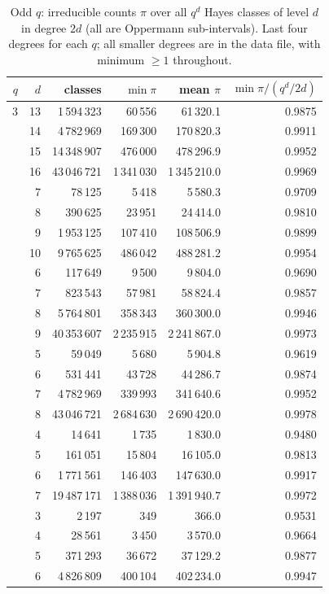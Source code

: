 \begin{table}[!htbp]
\centering
\caption{Odd $q$: irreducible counts $\pi$ over all $q^d$ Hayes classes of level $d$ in degree $2d$ (all are Oppermann sub-intervals). Last four degrees for each $q$; all smaller degrees are in the data file, with minimum $\ge1$ throughout.}\label{tab:odd}
\begin{tabular}{rrrrrr}
\toprule
$q$ & $d$ & classes & $\min\pi$ & mean $\pi$ & $\min\pi/(q^d/2d)$\\
\midrule
3 & 13 & 1\,594\,323 & 60\,556 & 61\,320.1 & 0.9875\\
 & 14 & 4\,782\,969 & 169\,300 & 170\,820.3 & 0.9911\\
 & 15 & 14\,348\,907 & 476\,000 & 478\,296.9 & 0.9952\\
 & 16 & 43\,046\,721 & 1\,341\,030 & 1\,345\,210.0 & 0.9969\\
\addlinespace
5 & 7 & 78\,125 & 5\,418 & 5\,580.3 & 0.9709\\
 & 8 & 390\,625 & 23\,951 & 24\,414.0 & 0.9810\\
 & 9 & 1\,953\,125 & 107\,410 & 108\,506.9 & 0.9899\\
 & 10 & 9\,765\,625 & 486\,042 & 488\,281.2 & 0.9954\\
\addlinespace
7 & 6 & 117\,649 & 9\,500 & 9\,804.0 & 0.9690\\
 & 7 & 823\,543 & 57\,981 & 58\,824.4 & 0.9857\\
 & 8 & 5\,764\,801 & 358\,343 & 360\,300.0 & 0.9946\\
 & 9 & 40\,353\,607 & 2\,235\,915 & 2\,241\,867.0 & 0.9973\\
\addlinespace
9 & 5 & 59\,049 & 5\,680 & 5\,904.8 & 0.9619\\
 & 6 & 531\,441 & 43\,728 & 44\,286.7 & 0.9874\\
 & 7 & 4\,782\,969 & 339\,993 & 341\,640.6 & 0.9952\\
 & 8 & 43\,046\,721 & 2\,684\,630 & 2\,690\,420.0 & 0.9978\\
\addlinespace
11 & 4 & 14\,641 & 1\,735 & 1\,830.0 & 0.9480\\
 & 5 & 161\,051 & 15\,804 & 16\,105.0 & 0.9813\\
 & 6 & 1\,771\,561 & 146\,403 & 147\,630.0 & 0.9917\\
 & 7 & 19\,487\,171 & 1\,388\,036 & 1\,391\,940.7 & 0.9972\\
\addlinespace
13 & 3 & 2\,197 & 349 & 366.0 & 0.9531\\
 & 4 & 28\,561 & 3\,450 & 3\,570.0 & 0.9664\\
 & 5 & 371\,293 & 36\,672 & 37\,129.2 & 0.9877\\
 & 6 & 4\,826\,809 & 400\,104 & 402\,234.0 & 0.9947\\
\bottomrule
\end{tabular}
\end{table}

